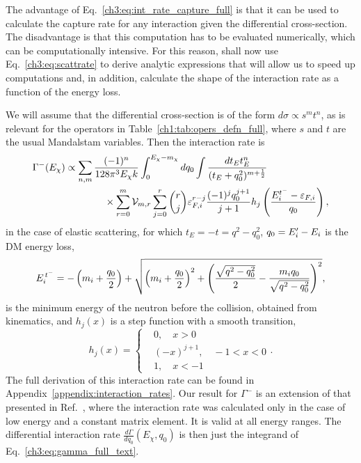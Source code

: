 The advantage of Eq.~\ref{ch3:eq:int_rate_capture_full} is that it can be used to calculate the capture rate for any interaction given the differential cross-section. The disadvantage is that this computation has to be evaluated numerically, which can be computationally intensive. For this reason, shall now use Eq.~\ref{ch3:eq:scattrate} to derive analytic expressions that will allow us to speed up computations and, in addition, calculate the shape of the interaction rate as a function of the energy loss. 

We will assume that the differential cross-section is of the form $d\sigma \propto s^m t^n$, as is relevant for the operators in Table~\ref{ch1:tab:opers_defn_full}, where $s$ and $t$ are the usual Mandalstam variables. Then the interaction rate is
\begin{equation}
    \begin{split}
        \Gamma^{-}(E_\chi) & \propto \sum_{n,m}  \frac{(-1)^n }{128\pi^3 E_\chi k }\int_0^{E_\chi -m_\chi} dq_0\int \frac{dt_E t_E^n}{(t_E + q_0^2)^{m+\frac{1}{2}}}\\
        &\hspace{4em}\times\sum_{r=0}^m \mathcal{V}_{m,r}\sum_{j = 0}^r\binom{r}{j} \varepsilon_{F,i}^{r-j}  \frac{(-1)^{j} q_0^{j+1}}{j+1} h_j\left( \frac{E_i^{t^-} - \varepsilon_{F,i}}{q_0}\right),
    \end{split}
    \label{ch3:eq:gamma_full_text}
\end{equation}
in the case of elastic scattering, for which $t_E=-t=q^2-q_0^2$, $q_0=E_i'-E_i$ is the DM energy loss, 
\begin{equation}
E_i^{\, t^{-}} = -\left(m_i+\frac{q_0}{2}\right) + \sqrt{\left(m_i+\frac{q_0}{2}\right)^2+\left(\frac{\sqrt{q^2-q_0^2}}{2}-\frac{m_i q_0}{\sqrt{q^2-q_0^2}}\right)^2}, 
\label{ch3:eq:Etm_def}
\end{equation}
is the minimum energy of the neutron before the collision, obtained from kinematics,  and $h_j(x)$ is a step function with a smooth transition, 
\begin{equation}
    h_j(x) = \begin{cases}
        & 0, \quad x >0\\
        & (-x)^{j+1},\quad -1<x <0\\
        & 1,\quad x<-1
    \end{cases}.
    \label{ch3:eq:h_stepfn}
\end{equation}
The full derivation of this interaction rate can be found in Appendix~\ref{appendix:interaction_rates}. 
Our result for $\Gamma^-$ is an extension of that presented in Ref.~\cite{Bertoni:2013bsa_dec_DarkMatterThermalization}, where the interaction rate was calculated only in the case of low energy and a constant matrix element. It is valid at all energy ranges.
The differential interaction rate $\frac{d\Gamma}{d q_0}(E_\chi,q_0)$ is then just the integrand of Eq.~\ref{ch3:eq:gamma_full_text}.


